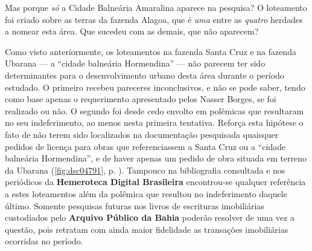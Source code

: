 






Mas porque \textit{só} a Cidade Balneária Amaralina aparece na pesquisa? O loteamento foi criado sobre as terras da fazenda Alagoa, que é \textit{uma} entre as \textit{quatro} herdades a nomear esta área. Que sucedeu com as demais, que não aparecem?

Como visto anteriormente, os loteamentos na fazenda Santa Cruz e na fazenda Ubarana --- a ``cidade balneária Hormendina'' --- não parecem ter sido determinantes para o desenvolvimento urbano desta área durante o período estudado. O primeiro recebeu pareceres inconclusivos, e não se pode saber, tendo como base apenas o requerimento apresentado pelos Nasser Borges, se foi realizado ou não. O segundo foi desde cedo envolto em polêmicas que resultaram no seu indeferimento, ao menos nesta primeira tentativa. Reforça esta hipótese o fato de não terem sido localizados na documentação pesquisada quaisquer pedidos de licença para obras que referenciassem a Santa Cruz ou a ``cidade balneária Hormendina'', e de haver apenas um pedido de obra situada em terreno da Ubarana (\autoref{fig:dsc04791}, p. \pageref{fig:dsc04791}). Tampouco na bibliografia consultada e nos periódicos da \textbf{Hemeroteca Digital Brasileira} encontrou-se qualquer referência a estes loteamentos além da polêmica que resultou no indeferimento daquele último. Somente pesquisas futuras nos livros de escrituras imobiliárias custodiados pelo \textbf{Arquivo Público da Bahia} poderão resolver de uma vez a questão, pois retratam com ainda maior fidelidade as transações imobiliárias ocorridas no período.

